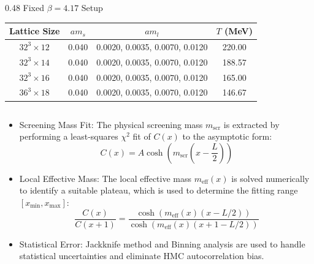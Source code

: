 \documentclass[10pt, aspectratio=169]{beamer} %
\begin{document}
\begin{frame}
\begin{columns}[c]
    \begin{column}{0.48\textwidth}
        \centering
        {\footnotesize Fixed $\beta = 4.17$ Setup} \\
        \vspace{0.3em}
        \tiny
        \renewcommand{\arraystretch}{1.15}
        \setlength{\tabcolsep}{2.5pt}
        \begin{tabular}{cccc}
            \toprule
            Lattice Size & $am_s$ & $am_l$ & $T$ (MeV) \\
            \midrule
            $32^3 \times 12$ & 0.040 & 0.0020, 0.0035, 0.0070, 0.0120 & 220.00 \\
            $32^3 \times 14$ & 0.040 & 0.0020, 0.0035, 0.0070, 0.0120 & 188.57 \\
            $32^3 \times 16$ & 0.040 & 0.0020, 0.0035, 0.0070, 0.0120 & 165.00 \\
            $36^3 \times 18$ & 0.040 & 0.0020, 0.0035, 0.0070, 0.0120 & 146.67 \\
            \bottomrule
        \end{tabular}
    \end{column}
\end{columns}
\vfill
\end{frame}



\begin{frame}
\vfill
{}
\begin{itemize}
    \item Screening Mass Fit: The physical screening mass $m_{\text{scr}}$ is extracted by performing a least-squares $\chi^2$ fit of $C(x)$ to the asymptotic form:
    \[
        C(x) = A \cosh\left(m_{\text{scr}}\left(x - \frac{L}{2}\right)\right)
    \]

    \item Local Effective Mass: The local effective mass $m_{\text{eff}}(x)$ is solved numerically to identify a suitable plateau, which is used to determine the fitting range $[x_{\text{min}}, x_{\text{max}}]$:
    \[
        \frac{C(x)}{C(x + 1)} = \frac{\cosh(m_{\text{eff}}(x)(x - L/2))}{\cosh(m_{\text{eff}}(x)(x + 1 - L/2))}
    \]

    \item Statistical Error: Jackknife method and Binning analysis are used to handle statistical uncertainties and eliminate HMC autocorrelation bias.
\end{itemize}
\vfill
\end{frame}
\end{document}
